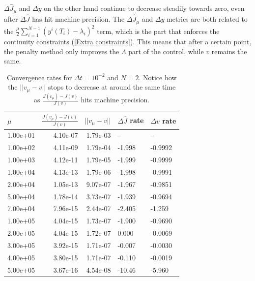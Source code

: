 \\
\\
$\Delta\hat J_{\mu}$ and $\Delta y$ on the other hand continue to decrease steadily towards zero, even after $\Delta \hat J$ has hit machine precision. The $\Delta\hat J_{\mu}$ and $\Delta y$ metrics are both related to the $\frac{\mu }{2}\sum_{i=1}^{N-1}(y^i(T_{i})-\lambda_i)^2$ term, which is the part that enforces the continuity constraints (\ref{Extra constraints}). This means that after a certain point, the penalty method only improves the $\Lambda$ part of the control, while $v$ remains the same. 
\begin{table}[!h]
\centering
\caption{Convergence rates for $\Delta t=10^{-2}$ and $N=2$. Notice how the $||v_{\mu}-v||$ stops to decrease at around the same time as $\frac{J(v_{\mu})-J(v)}{J(v)}$ hits machine precision.}
\label{Cosn_rate_table}
\begin{tabular}{lrrll}
\toprule
{} $\mu$&  $\frac{J(v_{\mu})-J(v)}{J(v)}$ &   $||v_{\mu}-v||$ &        $\Delta \hat J$ rate &        $\Delta v$ rate \\
\midrule
1.00e+01 &      4.10e-07 & 1.79e-03 &            -- &            -- \\
1.00e+02 &      4.11e-09 & 1.79e-04 & -1.998 & -0.9992 \\
1.00e+03 &      4.12e-11 & 1.79e-05 & -1.999 & -0.9999 \\
1.00e+04 &      4.13e-13 & 1.79e-06 & -1.998 & -0.9991 \\
2.00e+04 &      1.05e-13 & 9.07e-07 & -1.967 & -0.9851 \\
5.00e+04 &      1.78e-14 & 3.73e-07 & -1.939 & -0.9694 \\
7.00e+04 &      7.96e-15 & 2.44e-07 & -2.405 & -1.259 \\
1.00e+05 &      4.04e-15 & 1.73e-07 & -1.900 & -0.9690 \\
2.00e+05 &      4.04e-15 & 1.72e-07 &  0.000 & -0.0069 \\
3.00e+05 &      3.92e-15 & 1.71e-07 & -0.007 & -0.0030 \\
4.00e+05 &      3.80e-15 & 1.71e-07 & -0.110 & -0.0019 \\
5.00e+05 &      3.67e-16 & 4.54e-08 & -10.46 & -5.960 \\
\bottomrule
\end{tabular}
\end{table}

